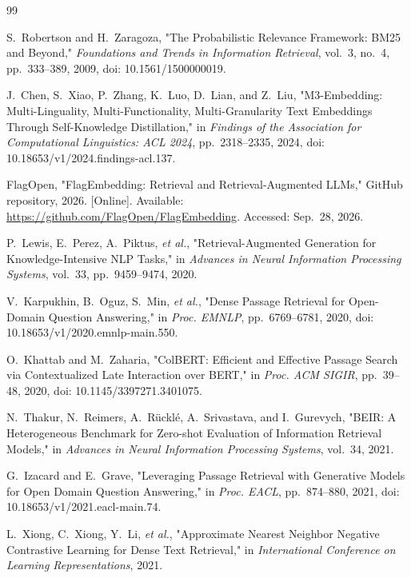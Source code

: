 \begin{thebibliography}{99}


S.~Robertson and H.~Zaragoza,
"The Probabilistic Relevance Framework: BM25 and Beyond,"
\emph{Foundations and Trends in Information Retrieval},
vol.~3, no.~4, pp.~333--389, 2009,
doi: 10.1561/1500000019.

J.~Chen, S.~Xiao, P.~Zhang, K.~Luo, D.~Lian, and Z.~Liu,
"M3-Embedding: Multi-Linguality, Multi-Functionality, Multi-Granularity Text Embeddings Through Self-Knowledge Distillation,"
in \emph{Findings of the Association for Computational Linguistics: ACL 2024},
pp.~2318--2335, 2024,
doi: 10.18653/v1/2024.findings-acl.137.

FlagOpen,
"FlagEmbedding: Retrieval and Retrieval-Augmented LLMs,"
GitHub repository, 2026. [Online]. Available:
\url{https://github.com/FlagOpen/FlagEmbedding}. Accessed: Sep.~28, 2026.

P.~Lewis, E.~Perez, A.~Piktus, \emph{et al.},
"Retrieval-Augmented Generation for Knowledge-Intensive NLP Tasks,"
in \emph{Advances in Neural Information Processing Systems}, vol.~33, pp.~9459--9474, 2020.

V.~Karpukhin, B.~Oguz, S.~Min, \emph{et al.},
"Dense Passage Retrieval for Open-Domain Question Answering,"
in \emph{Proc. EMNLP}, pp.~6769--6781, 2020,
doi: 10.18653/v1/2020.emnlp-main.550.

O.~Khattab and M.~Zaharia,
"ColBERT: Efficient and Effective Passage Search via Contextualized Late Interaction over BERT,"
in \emph{Proc. ACM SIGIR}, pp.~39--48, 2020,
doi: 10.1145/3397271.3401075.

N.~Thakur, N.~Reimers, A.~R\"uckl\'e, A.~Srivastava, and I.~Gurevych,
"BEIR: A Heterogeneous Benchmark for Zero-shot Evaluation of Information Retrieval Models,"
in \emph{Advances in Neural Information Processing Systems}, vol.~34, 2021.

G.~Izacard and E.~Grave,
"Leveraging Passage Retrieval with Generative Models for Open Domain Question Answering,"
in \emph{Proc. EACL}, pp.~874--880, 2021,
doi: 10.18653/v1/2021.eacl-main.74.

L.~Xiong, C.~Xiong, Y.~Li, \emph{et al.},
"Approximate Nearest Neighbor Negative Contrastive Learning for Dense Text Retrieval,"
in \emph{International Conference on Learning Representations}, 2021.


\end{thebibliography}
